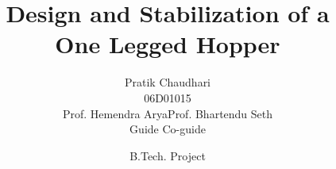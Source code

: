 \documentclass[xcolor=dvipsnames, 9pt]{beamer}
\title{Design and Stabilization of a\\[0.05in]One Legged Hopper}
\author[Pratik]{Pratik Chaudhari\\[0.1in]06D01015\\[0.3in]\small{Prof. Hemendra Arya\hfill Prof. Bhartendu Seth}\\[0.05in]\footnotesize{Guide\hspace{1.4in} Co-guide}}
\date{\footnotesize{B.Tech. Project}}
\begin{document}
{
\begin{frame}
\titlepage
\end{frame}
}







\end{document}
